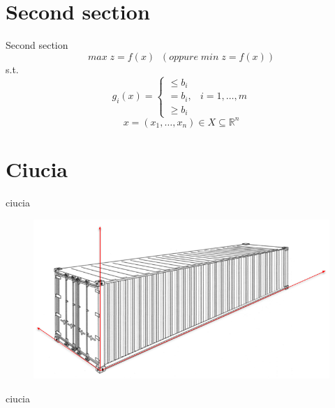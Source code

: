 \documentclass{beamer}
\begin{document}
	\section{Second section}
		\begin{frame}{Second section}
			$$ max\; z = f ( x )\;\; (oppure\; min\; z = f ( x ))$$
			s.t.
			$$g_i (x) = \begin{cases} \leq b_i \\ = b_i, & i = 1,\dots,m \\ \geq b_i \end{cases}$$
			$$x = (x_1,\dots,x_n) \in X \subseteq \mathbb{R}^n$$
		\end{frame}
	\section{Ciucia}
		\begin{frame}{ciucia}
			\begin{figure}[H]
				\begin{center} \includegraphics[scale=0.4]{figures/container_arrows}
				\end{center}
			\end{figure}
		\end{frame}{ciucia}
\end{document}
